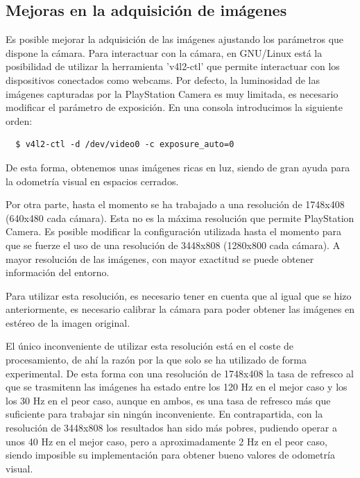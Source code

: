 \subsection{Mejoras en la adquisición de imágenes}

Es posible mejorar la adquisición de las imágenes ajustando los parámetros que
dispone la cámara. Para interactuar con la cámara, en GNU/Linux está la
posibilidad de utilizar la herramienta 'v4l2-ctl' que permite interactuar con
los dispositivos conectados como webcams. Por defecto, la luminosidad de las
imágenes capturadas por la PlayStation Camera es muy limitada, es necesario
modificar el parámetro de exposición. En una consola introducimos la siguiente
orden:
\\
\begin{lstlisting}
  $ v4l2-ctl -d /dev/video0 -c exposure_auto=0
\end{lstlisting}

De esta forma, obtenemos unas imágenes ricas en luz, siendo de gran ayuda para
la odometría visual en espacios cerrados.

Por otra parte, hasta el momento se ha trabajado a una resolución de 1748x408
(640x480 cada cámara). Esta no es la máxima resolución que permite PlayStation
Camera. Es posible modificar la configuración utilizada hasta el momento para
que se fuerze el uso de una resolución de 3448x808 (1280x800 cada cámara). A
mayor resolución de las imágenes, con mayor exactitud se puede obtener
información del entorno.

Para utilizar esta resolución, es necesario tener en cuenta que al igual que se
hizo anteriormente, es necesario calibrar la cámara para poder obtener las
imágenes en estéreo de la imagen original.

El único inconveniente de utilizar esta resolución está en el coste de
procesamiento, de ahí la razón por la que solo se ha utilizado de forma
experimental. De esta forma con una resolución de 1748x408 la tasa de refresco
al que se trasmitenn las imágenes ha estado entre los 120 Hz en el mejor caso y
los los 30 Hz en el peor caso, aunque en ambos, es una tasa de refresco más que
suficiente para trabajar sin ningún inconveniente. En contrapartida, con la
resolución de 3448x808 los resultados han sido más pobres, pudiendo operar a
unos 40 Hz en el mejor caso, pero a aproximadamente 2 Hz en el peor caso, siendo
imposible su implementación para obtener bueno valores de odometría visual.

